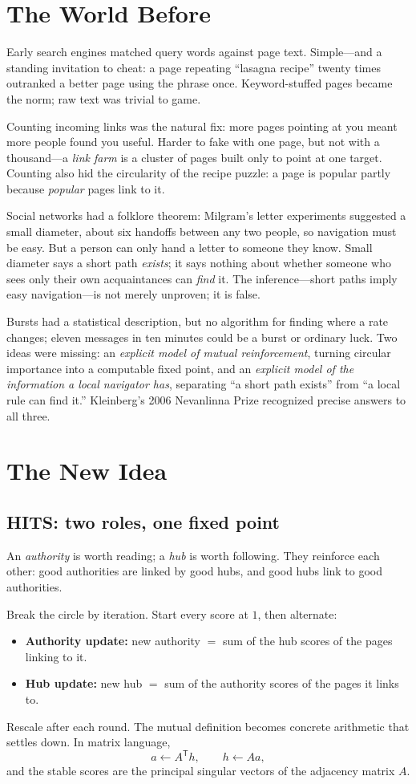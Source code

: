 \section{The World Before}
Early search engines matched query words against page text. Simple---and a standing invitation to cheat: a page repeating ``lasagna recipe'' twenty times outranked a better page using the phrase once. Keyword-stuffed pages became the norm; raw text was trivial to game.

Counting incoming links was the natural fix: more pages pointing at you meant more people found you useful. Harder to fake with one page, but not with a thousand---a \emph{link farm} is a cluster of pages built only to point at one target. Counting also hid the circularity of the recipe puzzle: a page is popular partly because \emph{popular} pages link to it.

Social networks had a folklore theorem: Milgram's letter experiments suggested a small diameter, about six handoffs between any two people, so navigation must be easy. But a person can only hand a letter to someone they know. Small diameter says a short path \emph{exists}; it says nothing about whether someone who sees only their own acquaintances can \emph{find} it. The inference---short paths imply easy navigation---is not merely unproven; it is false.

Bursts had a statistical description, but no algorithm for finding where a rate changes; eleven messages in ten minutes could be a burst or ordinary luck. Two ideas were missing: an \emph{explicit model of mutual reinforcement}, turning circular importance into a computable fixed point, and an \emph{explicit model of the information a local navigator has}, separating ``a short path exists'' from ``a local rule can find it.'' Kleinberg's 2006 Nevanlinna Prize recognized precise answers to all three.

\section{The New Idea}
\subsection{HITS: two roles, one fixed point}
An \emph{authority} is worth reading; a \emph{hub} is worth following. They reinforce each other: good authorities are linked by good hubs, and good hubs link to good authorities.

Break the circle by iteration. Start every score at $1$, then alternate:
\begin{itemize}
\item \textbf{Authority update:} new authority $=$ sum of the hub scores of the pages linking to it.
\item \textbf{Hub update:} new hub $=$ sum of the authority scores of the pages it links to.
\end{itemize}
Rescale after each round. The mutual definition becomes concrete arithmetic that settles down. In matrix language,
\[
a\leftarrow A^{\mathsf T}h,\qquad h\leftarrow Aa,
\]
and the stable scores are the principal singular vectors of the adjacency matrix $A$.

